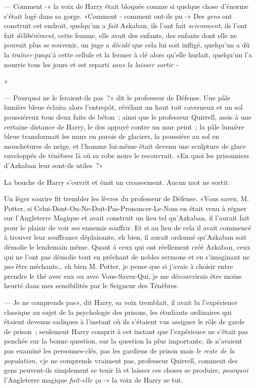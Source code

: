 --- Comment -» la voix de Harry était bloquée comme si quelque chose d'énorme s'était logé dans sa gorge. «Comment - comment ont-ils pu -» Des \emph{gens} ont construit cet endroit, quelqu'un a \emph{fait} Azkaban, ils l'ont fait \emph{sciemment}, ils l'ont fait \emph{délibérément}, cette femme, elle avait des enfants, des enfants dont elle ne pouvait plus se souvenir, un juge a \emph{décidé} que cela lui soit infligé, quelqu'un a dû la \emph{traîner} jusqu'à cette cellule et la fermer à clé alors qu'elle hurlait, quelqu'un l'a nourrie tous les jours et est reparti \emph{sans la laisser sortir -}

«

--- Pourquoi ne le feraient-ils pas~?» dit le professeur de Défense. Une pâle lumière bleue éclaira alors l'entrepôt, révélant un haut toit caverneux et un sol poussiéreux tous deux faits de béton~; ainsi que le professeur Quirrell, assis à une certaine distance de Harry, le dos appuyé contre un mur peint~; la pâle lumière bleue transformait les murs en parois de glaciers, la poussière au sol en mouchetures de neige, et l'homme lui-même était devenu une sculpture de glace enveloppée de ténèbres là où sa robe noire le recouvrait. «En quoi les prisonniers d'Azkaban leur sont-ils utiles~?»

La bouche de Harry s'ouvrit et émit un croassement. Aucun mot ne sortit.

Un léger sourire fit trembler les lèvres du professeur de Défense. «Vous savez, M. Potter, si Celui-Dont-On-Ne-Doit-Pas-Prononcer-Le-Nom en était venu à régner sur l'Angleterre Magique et avait construit un lieu tel qu'Azkaban, il l'aurait fait pour le plaisir de voir ses ennemis souffrir. Et si au lieu de cela il avait commencé à trouver leur souffrance déplaisante, eh bien, il aurait ordonné qu'Azkaban soit démolie le lendemain même. Quant à ceux qui ont réellement créé Azkaban, ceux qui ne l'ont pas démolie tout en prêchant de nobles sermons et en s'imaginant ne \emph{pas} être méchants… eh bien M. Potter, je pense que si j'avais à choisir entre prendre le thé avec eux ou avec Vous-Savez-Qui, je me découvrirais être moins heurté dans mes sensibilités par le Seigneur des Ténèbres.

--- Je ne comprends pas», dit Harry, sa voix tremblait, il avait lu l'expérience classique au sujet de la psychologie des prisons, les étudiants ordinaires qui étaient devenus sadiques à l'instant où ils s'étaient vus assigner le rôle de garde de prison~; seulement Harry comprit à cet instant que l'expérience ne s'était pas penchée sur la bonne question, sur la question la plus importante, ils n'avaient pas examiné les personnes-clés, pas les gardiens de prison mais \emph{le reste de la population}, «je ne comprends vraiment pas, professeur Quirrell, comment des gens peuvent-ils simplement se tenir là et laisser ces choses se produire, \emph{pourquoi} l'Angleterre magique \emph{fait-elle ça} -» la voix de Harry se tut.

